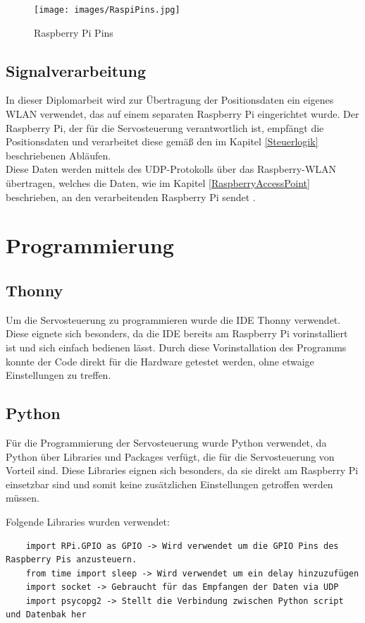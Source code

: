 \begin{figure}[H]
	\centering
	\texttt{[image: images/RaspiPins.jpg]}
	\caption[Raspberry Pi Pins]{Raspberry Pi Pins}
	\label{fig: Raspberry Pi Pins}
\end{figure}


\subsection{Signalverarbeitung}
In dieser Diplomarbeit wird zur Übertragung der Positionsdaten ein eigenes WLAN verwendet, das auf einem separaten Raspberry Pi eingerichtet wurde. Der Raspberry Pi, der für die Servosteuerung verantwortlich ist, empfängt die Positionsdaten und verarbeitet diese gemäß den im Kapitel \ref{Steuerlogik} beschriebenen Abläufen. \\
Diese Daten werden mittels des UDP-Protokolls über das Raspberry-WLAN übertragen, welches die Daten, wie im Kapitel \ref{RaspberryAccessPoint} beschrieben, an den verarbeitenden Raspberry Pi sendet	.

\newpage
\section{Programmierung}
\subsection{Thonny}
Um die Servosteuerung zu programmieren wurde die IDE Thonny verwendet. Diese eignete sich besonders, da die IDE bereits am Raspberry Pi vorinstalliert ist und sich einfach bedienen lässt. Durch diese Vorinstallation des Programms konnte der Code direkt für die Hardware getestet werden, ohne etwaige Einstellungen zu treffen.

\subsection{Python}
Für die Programmierung der Servosteuerung wurde Python verwendet, da Python über Libraries und Packages verfügt, die für die Servosteuerung von Vorteil sind. Diese Libraries eignen sich besonders, da sie direkt am Raspberry Pi einsetzbar sind und somit keine zusätzlichen Einstellungen getroffen werden müssen.

Folgende Libraries wurden verwendet:

\begin{lstlisting}
	import RPi.GPIO as GPIO -> Wird verwendet um die GPIO Pins des Raspberry Pis anzusteuern.
	from time import sleep -> Wird verwendet um ein delay hinzuzufügen
	import socket -> Gebraucht für das Empfangen der Daten via UDP
	import psycopg2 -> Stellt die Verbindung zwischen Python script und Datenbak her
\end{lstlisting}

